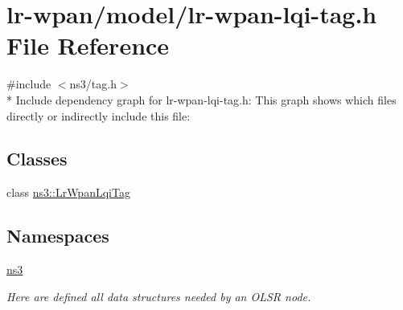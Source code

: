 \hypertarget{lr-wpan-lqi-tag_8h}{}\section{lr-\/wpan/model/lr-\/wpan-\/lqi-\/tag.h File Reference}
\label{lr-wpan-lqi-tag_8h}
{\ttfamily \#include $<$ns3/tag.\+h$>$}\\*
Include dependency graph for lr-\/wpan-\/lqi-\/tag.h\+:
This graph shows which files directly or indirectly include this file\+:
\subsection*{Classes}
\begin{DoxyCompactItemize}
\item 
class \hyperlink{classns3_1_1LrWpanLqiTag}{ns3\+::\+Lr\+Wpan\+Lqi\+Tag}
\end{DoxyCompactItemize}
\subsection*{Namespaces}
\begin{DoxyCompactItemize}
\item 
 \hyperlink{namespacens3}{ns3}
\begin{DoxyCompactList}\small\item\em Here are defined all data structures needed by an O\+L\+SR node. \end{DoxyCompactList}\end{DoxyCompactItemize}

